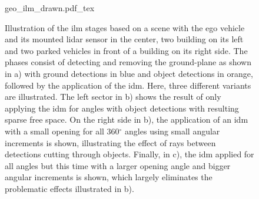 \begin{figure}
	\begin{center}
		{geo_ilm_drawn.pdf_tex}
		\caption{\label{fig:geo_ilm_drawn}Illustration of the \gls{ilm} stages based on a scene with the ego vehicle and its mounted lidar sensor in the center, two building on its left and two parked vehicles in front of a building on its right side. The phases consist of detecting and removing the ground-plane as shown in a) with ground detections in blue and object detections in orange, followed by the application of the \gls{idm}. Here, three different variants are illustrated. The left sector in b) shows the result of only applying the \gls{idm} for angles with object detections with resulting sparse free space. On the right side in b), the application of an \gls{idm} with a small opening for all 360$^\circ$ angles using small angular increments is shown, illustrating the effect of rays between detections cutting through objects. Finally, in c), the \gls{idm} applied for all angles but this time with a larger opening angle and bigger angular increments is shown, which largely eliminates the problematic effects illustrated in b).}
	\end{center}
\end{figure} 
%
